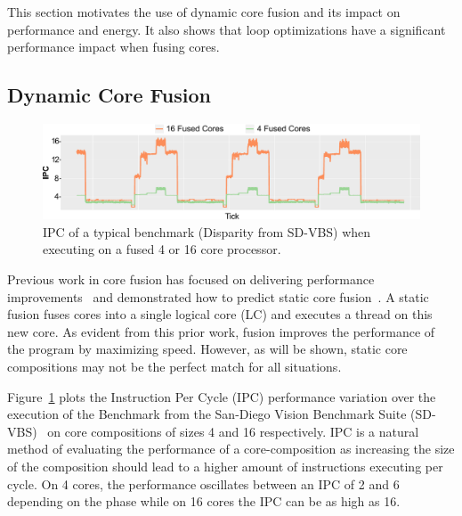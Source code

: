 This section motivates the use of dynamic core fusion and its impact on performance and energy.
It also shows that loop optimizations have a significant performance impact when fusing cores.

\subsection{Dynamic Core Fusion}
\begin{figure}[t]
    \centering
    \includegraphics[width=\textwidth]{cases-paper/graphics/motivation/disp_opt_4_16_3.pdf}
    \caption{IPC of a typical benchmark (Disparity from SD-VBS) when executing on a fused 4 or 16 core processor.} 
    \label{fig:disp_ex}
	\vspace{1em}
\end{figure}

Previous work in core fusion has focused on delivering performance improvements~\cite{ipek2007CoreFusion,kim2007tflex} and demonstrated how to predict static core fusion~\cite{micolet2016dmpstream}.
A static fusion fuses cores into a single logical core (LC) and executes a thread on this new core.
As evident from this prior work, fusion improves the performance of the program by maximizing speed.
However, as will be shown, static core compositions may not be the perfect match for all situations.

Figure~\ref{fig:disp_ex} plots the Instruction Per Cycle (IPC) performance variation over the execution of the  Benchmark from the San-Diego Vision Benchmark Suite (SD-VBS)~\cite{sdvbs} on core compositions of sizes 4 and 16 respectively.
IPC is a natural method of evaluating the performance of a core-composition as increasing the size of the composition should lead to a higher amount of instructions executing per cycle.
On 4 cores, the performance oscillates between an IPC of 2 and 6 depending on the phase while on 16 cores the IPC can be as high as 16.

